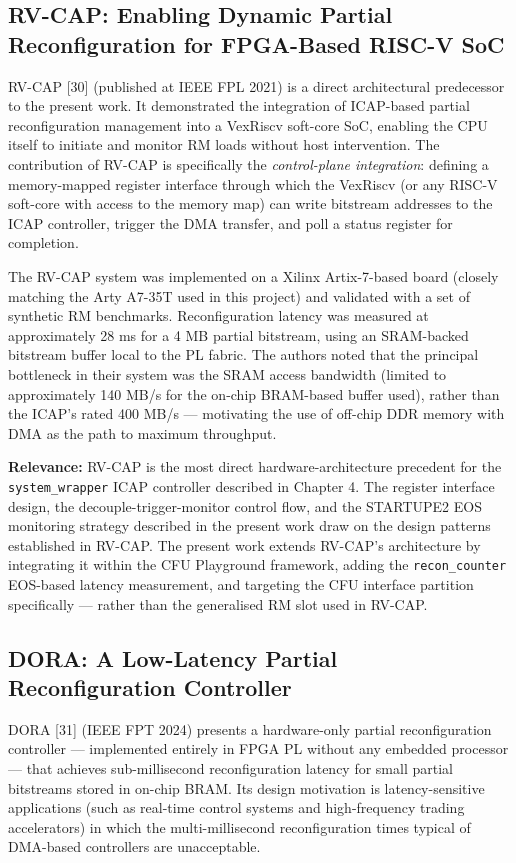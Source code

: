 \subsection{RV-CAP: Enabling Dynamic Partial Reconfiguration for FPGA-Based RISC-V SoC}

RV-CAP [30] (published at IEEE FPL 2021) is a direct architectural predecessor to the present work. It demonstrated the integration of ICAP-based partial reconfiguration management into a VexRiscv soft-core SoC, enabling the CPU itself to initiate and monitor RM loads without host intervention. The contribution of RV-CAP is specifically the \textit{control-plane integration}: defining a memory-mapped register interface through which the VexRiscv (or any RISC-V soft-core with access to the memory map) can write bitstream addresses to the ICAP controller, trigger the DMA transfer, and poll a status register for completion.

The RV-CAP system was implemented on a Xilinx Artix-7-based board (closely matching the Arty A7-35T used in this project) and validated with a set of synthetic RM benchmarks. Reconfiguration latency was measured at approximately 28 ms for a 4 MB partial bitstream, using an SRAM-backed bitstream buffer local to the PL fabric. The authors noted that the principal bottleneck in their system was the SRAM access bandwidth (limited to approximately 140 MB/s for the on-chip BRAM-based buffer used), rather than the ICAP's rated 400 MB/s — motivating the use of off-chip DDR memory with DMA as the path to maximum throughput.

\textbf{Relevance:} RV-CAP is the most direct hardware-architecture precedent for the \texttt{system\_wrapper} ICAP controller described in Chapter 4. The register interface design, the decouple-trigger-monitor control flow, and the STARTUPE2 EOS monitoring strategy described in the present work draw on the design patterns established in RV-CAP. The present work extends RV-CAP's architecture by integrating it within the CFU Playground framework, adding the \texttt{recon\_counter} EOS-based latency measurement, and targeting the CFU interface partition specifically — rather than the generalised RM slot used in RV-CAP.

\subsection{DORA: A Low-Latency Partial Reconfiguration Controller}

DORA [31] (IEEE FPT 2024) presents a hardware-only partial reconfiguration controller — implemented entirely in FPGA PL without any embedded processor — that achieves sub-millisecond reconfiguration latency for small partial bitstreams stored in on-chip BRAM. Its design motivation is latency-sensitive applications (such as real-time control systems and high-frequency trading accelerators) in which the multi-millisecond reconfiguration times typical of DMA-based controllers are unacceptable.


